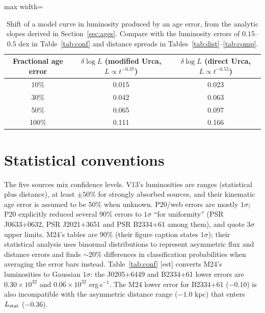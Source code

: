 \documentclass[11pt,a4paper]{article}
\newcommand{\src}[1]{\textsf{[#1]}}
\begin{document}
\begin{table}[htbp]
\centering\small
\caption{Shift of a model curve in luminosity produced by an age error, from the analytic slopes derived in Section~\ref{sec:ages}. Compare with the luminosity errors of $0.15$--$0.5$ dex in Table~\ref{tab:conf} and distance spreads in Tables~\ref{tab:dist}--\ref{tab:comp}.}\label{tab:agesens}
\begin{adjustbox}{max width=\textwidth}\begin{tabular}{ccc}
\toprule
Fractional age error & $\delta\log L$ (modified Urca, $L\propto t^{-0.37}$) & $\delta\log L$ (direct Urca, $L\propto t^{-0.55}$)\\
\midrule
10\% & 0.015 & 0.023\\
30\% & 0.042 & 0.063\\
50\% & 0.065 & 0.097\\
100\% & 0.111 & 0.166\\
\bottomrule
\end{tabular}\end{adjustbox}
\end{table}


\section{Statistical conventions}\label{sec:stats}
The five sources mix confidence levels. V13's luminosities are ranges (statistical plus distance), at least $\pm50\%$ for strongly absorbed sources, and their kinematic age error is assumed to be 50\% when unknown. P20/web errors are mostly $1\sigma$; P20 explicitly reduced several 90\% errors to $1\sigma$ ``for uniformity'' (PSR J0633+0632, PSR J2021+3651 and PSR B2334+61 among them), and quote $3\sigma$ upper limits. M24's tables are 90\% (their figure caption states $1\sigma$); their statistical analysis uses binormal distributions to represent asymmetric flux and distance errors and finds $\sim20\%$ differences in classification probabilities when averaging the error bars instead. Table~\ref{tab:conf} \src{est} converts M24's luminosities to Gaussian $1\sigma$: the J0205+6449 and B2334+61 lower errors are $0.30\times10^{32}$ and $0.06\times10^{32}$ erg\,s$^{-1}$. The M24 lower error for B2334+61 ($-0.10$) is also incompatible with the asymmetric distance range ($-1.0$ kpc) that enters $L_{\rm stat}$ ($-0.36$).
\end{document}
